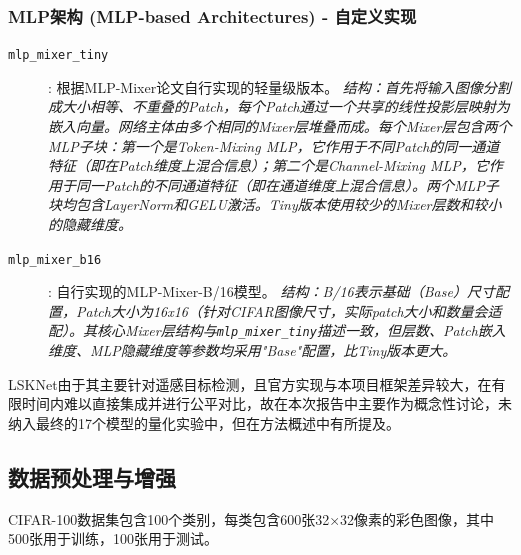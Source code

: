 \documentclass[a4paper]{article}
\begin{document}
\subsubsection{MLP架构 (MLP-based Architectures) - 自定义实现}
\begin{description}
    \item[\texttt{mlp\_mixer\_tiny}]: 根据MLP-Mixer论文自行实现的轻量级版本。 \textit{结构：首先将输入图像分割成大小相等、不重叠的Patch，每个Patch通过一个共享的线性投影层映射为嵌入向量。网络主体由多个相同的Mixer层堆叠而成。每个Mixer层包含两个MLP子块：第一个是Token-Mixing MLP，它作用于不同Patch的同一通道特征（即在Patch维度上混合信息）；第二个是Channel-Mixing MLP，它作用于同一Patch的不同通道特征（即在通道维度上混合信息）。两个MLP子块均包含LayerNorm和GELU激活。Tiny版本使用较少的Mixer层数和较小的隐藏维度。}
    \item[\texttt{mlp\_mixer\_b16}]: 自行实现的MLP-Mixer-B/16模型。 \textit{结构：B/16表示基础（Base）尺寸配置，Patch大小为16x16（针对CIFAR图像尺寸，实际patch大小和数量会适配）。其核心Mixer层结构与\texttt{mlp\_mixer\_tiny}描述一致，但层数、Patch嵌入维度、MLP隐藏维度等参数均采用"Base"配置，比Tiny版本更大。}
\end{description}
LSKNet由于其主要针对遥感目标检测，且官方实现与本项目框架差异较大，在有限时间内难以直接集成并进行公平对比，故在本次报告中主要作为概念性讨论，未纳入最终的17个模型的量化实验中，但在方法概述中有所提及。

\subsection{数据预处理与增强}
CIFAR-100数据集包含100个类别，每类包含600张32×32像素的彩色图像，其中500张用于训练，100张用于测试。
\end{document}
